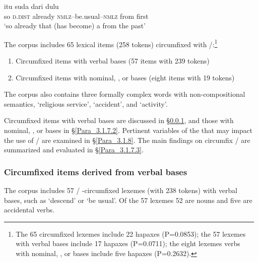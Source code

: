 \ea
\label{Example_3.71}
 {itu} {suda} {} {dari} {dulu}\\ %
 so  \textsc{d.dist}  already  \textsc{nmlz}–be.usual–\textsc{nmlz}  from  first\\

\glt 
‘so already that (has become) a  from the past’ \textstyleExampleSource{[081014-007-CvEx.0063]}
\z


The corpus includes 65 lexical items (258 tokens) circumfixed with \textitbf{-}/\textitbf{-}:\footnote{The 65 circumfixed lexemes include 22 hapaxes (P=0.0853); the 57 lexemes with verbal bases include 17 hapaxes (P=0.0711); the eight lexemes verbs with nominal, , or  bases include five hapaxes (P=0.2632).}



\begin{enumerate}
\item 
Circumfixed items with verbal bases (57 items with 239 tokens)
\item 
Circumfixed items with nominal, , or  bases (eight items with 19 tokens)

\end{enumerate}

The corpus also contains three formally complex words with non-composi\-tion\-al semantics,  ‘religious service’,  ‘accident’, and  ‘activity’.



Circumfixed items with verbal bases are discussed in §\ref{Para_3.1.7.1}, and those with nominal, , or  bases in §\ref{Para_3.1.7.2}. Pertinent variables of the  that may impact the use of \textitbf{-}/\textitbf{-} are examined in §\ref{Para_3.1.8}. The main findings on circumfix \textitbf{-}/\textitbf{-} are summarized and evaluated in §\ref{Para_3.1.7.3}.


\subsubsection[Circumfixed items derived from verbal bases]{Circumfixed items derived from verbal bases}\label{Para_3.1.7.1}

The corpus includes 57 \textitbf{-}/\textitbf{-} -circumfixed lexemes (with 238 tokens) with verbal bases, such as   ‘descend’ or   ‘be usual’. Of the 57 lexemes 52 are nouns and five are accidental verbs.



